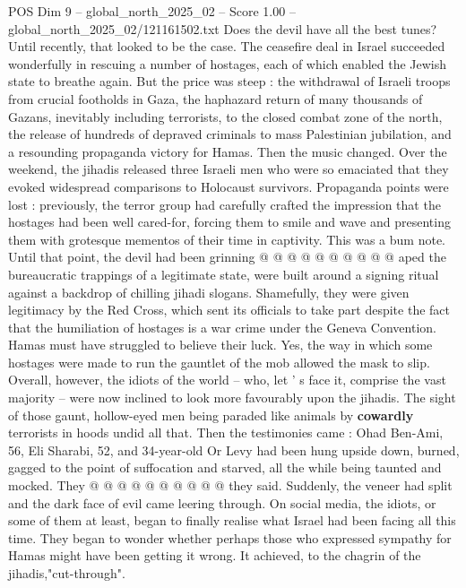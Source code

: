 \begin{textsample}{POS Dim 9 – global\_north\_2025\_02 – Score 1.00 – global\_north\_2025\_02/121161502.txt}  \label{ex:f9_pos_440}
Does the devil have all the best tunes?
Until recently, that looked to be the case.
The ceasefire deal in Israel succeeded wonderfully in rescuing a number of hostages, each of which enabled the Jewish state to breathe again.
But the price was steep : the withdrawal of Israeli troops from crucial footholds in Gaza, the haphazard return of many thousands of Gazans, inevitably including terrorists, to the closed combat zone of the north, the release of hundreds of depraved criminals to mass Palestinian jubilation, and a resounding propaganda victory for Hamas.
Then the music changed.
Over the weekend, the jihadis released three Israeli men who were so emaciated that they evoked widespread comparisons to Holocaust survivors.
Propaganda points were lost : previously, the terror group had carefully crafted the impression that the hostages had been well cared-for, forcing them to smile and wave and presenting them with grotesque mementos of their time in captivity.
This was a bum note.
Until that point, the devil had been grinning @ @ @ @ @ @ @ @ @ @ aped the bureaucratic trappings of a legitimate state, were built around a signing ritual against a backdrop of chilling jihadi slogans.
Shamefully, they were given legitimacy by the Red Cross, which sent its officials to take part despite the fact that the humiliation of hostages is a war crime under the Geneva Convention.
Hamas must have struggled to believe their luck.
Yes, the way in which some hostages were made to run the gauntlet of the mob allowed the mask to slip.
Overall, however, the idiots of the world -- who, let ' s face it, comprise the vast majority -- were now inclined to look more favourably upon the jihadis.
The sight of those gaunt, hollow-eyed men being paraded like animals by \textbf{cowardly} terrorists in hoods undid all that.
Then the testimonies came : Ohad Ben-Ami, 56, Eli Sharabi, 52, and 34-year-old Or Levy had been hung upside down, burned, gagged to the point of suffocation and starved, all the while being taunted and mocked.
They @ @ @ @ @ @ @ @ @ @ they said.
Suddenly, the veneer had split and the dark face of evil came leering through.
On social media, the idiots, or some of them at least, began to finally realise what Israel had been facing all this time.
They began to wonder whether perhaps those who expressed sympathy for Hamas might have been getting it wrong.
It achieved, to the chagrin of the jihadis,"cut-through".

\end{textsample}
